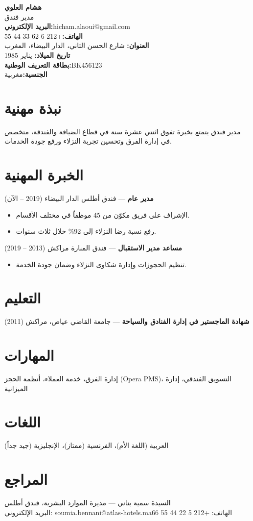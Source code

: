 \documentclass[12pt,a4paper]{article}
\newcommand{\field}[2]{\textbf{#1:}\quad #2\\[0.3em]}
\begin{document}
{\Huge\bfseries\color{accent} هشام العلوي}\\[0.3em]
{\large مدير فندق}\\[0.8em]

\field{البريد الإلكتروني}{\textenglish{hicham.alaoui@gmail.com}}
\field{الهاتف}{\textenglish{+212 6 62 33 44 55}}
\field{العنوان}{12 شارع الحسن الثاني، الدار البيضاء، المغرب}
\field{تاريخ الميلاد}{8 يناير 1985}
\field{بطاقة التعريف الوطنية}{\textenglish{BK456123}}
\field{الجنسية}{مغربية}

\section{نبذة مهنية}
مدير فندق يتمتع بخبرة تفوق اثنتي عشرة سنة في قطاع الضيافة والفندقة،
متخصص في إدارة الفرق وتحسين تجربة النزلاء ورفع جودة الخدمات.

\section{الخبرة المهنية}
\textbf{مدير عام} — فندق أطلس الدار البيضاء \hfill (2019 -- الآن)
\begin{itemize}[leftmargin=1.4em]
  \item الإشراف على فريق مكوّن من 45 موظفاً في مختلف الأقسام.
  \item رفع نسبة رضا النزلاء إلى 92\% خلال ثلاث سنوات.
\end{itemize}
\vspace{0.3em}
\textbf{مساعد مدير الاستقبال} — فندق المنارة مراكش \hfill (2013 -- 2019)
\begin{itemize}[leftmargin=1.4em]
  \item تنظيم الحجوزات وإدارة شكاوى النزلاء وضمان جودة الخدمة.
\end{itemize}

\section{التعليم}
\textbf{شهادة الماجستير في إدارة الفنادق والسياحة} — جامعة القاضي عياض، مراكش \hfill (2011)

\section{المهارات}
إدارة الفرق، خدمة العملاء، أنظمة الحجز \textenglish{(Opera PMS)}، التسويق الفندقي، إدارة الميزانية

\section{اللغات}
العربية (اللغة الأم)، الفرنسية (ممتاز)، الإنجليزية (جيد جداً)

\section{المراجع}
السيدة سمية بناني — مديرة الموارد البشرية، فندق أطلس\\
البريد الإلكتروني: \textenglish{soumia.bennani@atlas-hotels.ma}\quad الهاتف: \textenglish{+212 5 22 44 55 66}
\end{document}
